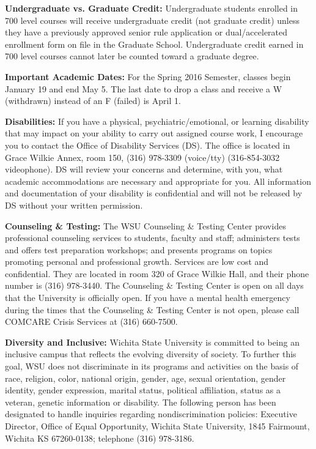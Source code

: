 \documentclass[11pt, a4paper]{article}
\begin{document}
\vspace*{.15in}
\noindent\textbf{Undergraduate vs. Graduate Credit:}
Undergraduate students enrolled in 700 level courses will receive undergraduate credit (not graduate credit) unless they have a previously approved senior rule application or dual/accelerated enrollment form on file in the Graduate School. Undergraduate credit earned in 700 level courses cannot later be counted toward a graduate degree.

\vspace*{.15in}
\noindent\textbf{Important Academic Dates:}
For the Spring 2016 Semester, classes begin January 19 and end May 5.
The last date to drop a class and receive a W (withdrawn) instead of an F (failed) is April 1.

\vspace*{.15in}
\noindent\textbf{Disabilities:}
If you have a physical, psychiatric/emotional, or learning disability that may impact on your ability to carry out assigned course work, I encourage you to contact the Office of Disability Services (DS).
The office is located in Grace Wilkie Annex, room 150, (316) 978-3309 (voice/tty) (316-854-3032 videophone). DS will review your concerns and determine, with you, what academic accommodations are necessary and appropriate for you. All information and documentation of your disability is confidential and will not be released by DS without your written permission.

\vspace*{.15in}
\noindent\textbf{Counseling \& Testing:}
The WSU Counseling \& Testing Center provides professional counseling services to students, faculty and staff; administers tests and offers test preparation workshops; and presents programs on topics promoting personal and professional growth. Services are low cost and confidential. They are located in room 320 of Grace Wilkie Hall, and their phone number is (316) 978-3440. The Counseling \& Testing Center is open on all days that the University is officially open. If you have a mental health emergency during the times that the Counseling \& Testing Center is not open, please call COMCARE Crisis Services at (316) 660-7500.

\vspace*{.15in}
\noindent\textbf{Diversity and Inclusive:}
Wichita State University is committed to being an inclusive campus that reflects the evolving diversity of society. To further this goal, WSU does not discriminate in its programs and activities on the basis of race, religion, color, national origin, gender, age, sexual orientation, gender identity, gender expression, marital status, political affiliation, status as a veteran, genetic information or disability. The following person has been designated to handle inquiries regarding nondiscrimination policies: Executive Director, Office of Equal Opportunity, Wichita State University, 1845 Fairmount, Wichita KS 67260-0138; telephone (316) 978-3186.
\end{document}
